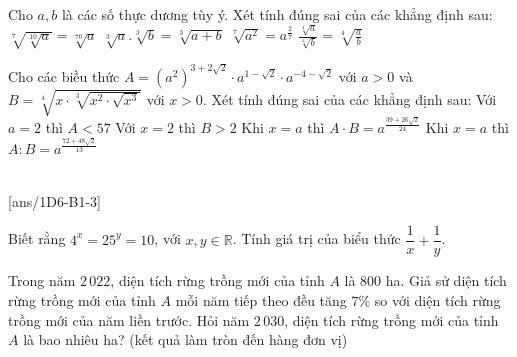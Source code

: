 \begin{ex}
	Cho ${a,b}$ là các số thực dương tùy ý. Xét tính đúng sai của các khẳng định sau:
	\choiceTF
	{ \True $\sqrt[7]{\sqrt[10] { a} }=\sqrt[70]{a}$ }
	{ $\sqrt[3]{a}. \sqrt[3]{b}=\sqrt[3]{a + b}$ }
	{ \True $\sqrt[7]{a^{2}}= a^{\tfrac{2}{7}}$ }
	{ \True $\frac{\sqrt[4]{a}}{\sqrt[4]{b}}=\sqrt[4]{\frac{a}{b}}$ }
	\end{ex}

\begin{ex}
	Cho các biều thức $A=\left(a^2\right)^{3+2 \sqrt{2}} \cdot a^{1-\sqrt{2}} \cdot a^{-4-\sqrt{2}}$ với $a>0$ và $B=\sqrt[4]{x \cdot \sqrt[3]{x^2 \cdot \sqrt{x^3}}}$ với $x>0$. Xét tính đúng sai của các khẳng định sau:
	\choiceTF
	{\True Với $a=2$ thì $A<57$}
	{Với $x=2$ thì $B>2$}
	{\True Khi $x=a$ thì $A \cdot B=a^{\frac{39+26 \sqrt{2}}{24}}$}
	{\True Khi $x=a$ thì $A: B=a^{\frac{72+48 \sqrt{2}}{13}}$}
	\loigiai{
		
	}
\end{ex}


 \\
[ans/1D6-B1-3]

\begin{ex}%
	Biết rằng $4^x=25^{y}=10$, với $x,y \in \mathbb{R}$. Tính giá trị của biểu thức $\dfrac{1}{x}+\dfrac{1}{y}$.\\
\end{ex}

\begin{ex}%
	Trong năm $2\,022$, diện tích rừng trồng mới của tỉnh $A$ là $800$ ha. Giả sử diện tích rừng trồng mới của tỉnh $A$ mỗi năm tiếp theo đều tăng $7\%$ so với diện tích rừng trồng mới của năm liền trước. Hỏi năm $2\,030$, diện tích rừng trồng mới của tỉnh $A$ là bao nhiêu ha? (kết quả làm tròn đến hàng đơn vị)\\
\end{ex}

